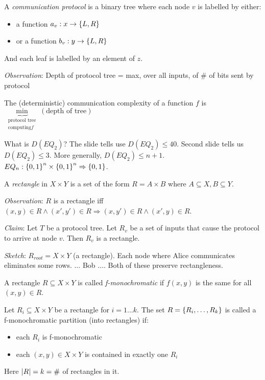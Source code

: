 A \emph{communication protocol} is a binary tree where each node $v$ is labelled by either:

\begin{itemize}
    \item a function $a_v: x \rightarrow \left \{ L, R \right \}$
    \item or a function $b_v: y \rightarrow \left \{ L, R \right \}$
\end{itemize}

And each leaf is labelled by an element of $z$.

\emph{Observation}: Depth of protocol tree = max, over all inputs, of \# of bits sent by protocol

\begin{definition}
    The (deterministic) communication complexity of a function $f$ is $\underbrace{\min}_{\substack{\text{protocol tree} \\ \text{computing} f}} (\text{depth of tree})$
\end{definition}

What is $D(EQ_2)$? The slide tells use $D(EQ_2) \leq 40$. Second slide tells us $D(EQ_2) \leq 3$. More generally, $D(EQ_2) \leq n + 1$. $EQ_n : \left \{ 0, 1 \right \}^n \times \left \{ 0, 1 \right \}^n \Rightarrow \left \{ 0, 1 \right \}$.

\begin{definition}
    A \emph{rectangle} in $X \times Y$ is a set of the form $R = A \times B$ where $A \subseteq X, B \subseteq Y$.
\end{definition}

\emph{Observation}: $R$ is a rectangle iff $(x, y) \in R \wedge (x', y') \in R \Rightarrow (x, y') \in R \wedge (x', y) \in R$.

\emph{Claim}:  Let $T$ be a protocol tree. Let $R_v$ be a set of inputs that cause the protocol to arrive at node $v$. Then $R_v$ is a rectangle.

\emph{Sketch}: $R_{root} = X \times Y$ (a rectangle). Each node where Alice communicates eliminates some rows. $\ldots$ Bob $\ldots$. Both of these preserve rectangleness.

\begin{definition}
    A rectangle $R \subseteq X \times Y$ is called \emph{f-monochromatic} if $f(x, y)$ is the same for all $(x, y) \in R$.
\end{definition}

\begin{definition}
    Let $R_i \subseteq X \times Y$ be a rectangle for $i = 1 \ldots k$. The set $R = \left \{ R_i, \ldots, R_k \right \}$ is called a f-monochromatic partition (into rectangles) if:

    \begin{itemize}
        \item each $R_i$ is f-monochromatic
        \item each $(x, y) \in X \times Y$ is contained in exactly one $R_i$
    \end{itemize}

    Here $\left | R \right | = k = \#$ of rectangles in it.
\end{definition}

